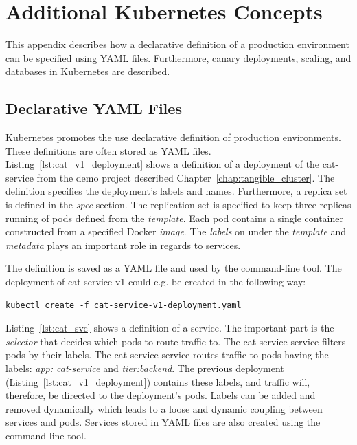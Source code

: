 \chapter{Additional Kubernetes Concepts}
\label{appendix:kubernetes}
This appendix describes how a declarative definition of a production environment can be specified using YAML files. Furthermore, canary deployments, scaling, and databases in Kubernetes are described.


\section*{Declarative YAML Files}
Kubernetes promotes the use declarative definition of production environments. These definitions are often stored as YAML files. Listing~\ref{lst:cat_v1_deployment} shows a definition of a deployment of the cat-service from the demo project described Chapter~\ref{chap:tangible_cluster}. The definition specifies the deployment's labels and names. Furthermore, a replica set is defined in the \textit{spec} section. The replication set is specified to keep three replicas running of pods defined from the \textit{template}. Each pod contains a single container constructed from a specified Docker \textit{image}. The \textit{labels} on under the \textit{template} and \textit{metadata} plays an important role in regards to services.



\noindent
The definition is saved as a YAML file and used by the command-line tool. The deployment of cat-service v1 could e.g. be created in the following way: \\

\newpage
\begin{lstlisting}
kubectl create -f cat-service-v1-deployment.yaml
\end{lstlisting}

\noindent
Listing~\ref{lst:cat_svc} shows a definition of a service. The important part is the \textit{selector} that decides which pods to route traffic to. The cat-service service filters pods by their labels. The cat-service service routes traffic to pods having the labels: \textit{app: cat-service} and \textit{tier:backend}. The previous deployment (Listing~\ref{lst:cat_v1_deployment}) contains these labels, and traffic will, therefore, be directed to the deployment's pods. Labels can be added and removed dynamically which leads to a loose and dynamic coupling between services and pods. Services stored in YAML files are also created using the command-line tool.

